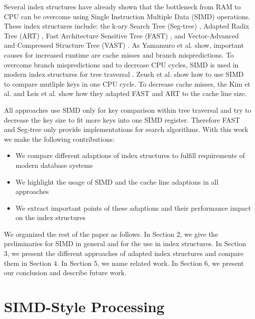 \documentclass[runningheads,a4paper]{llncs}
\begin{document}
Several index structures have already shown that the bottleneck from RAM to CPU can be overcome using Single Instruction Multiple Data (SIMD) \cite{suaib2011architecture} operations. These index structures include: the k-ary Search Tree (Seg-tree) \cite{zeuch2014adapting}, Adapted Radix Tree (ART) \cite{leis2013adaptive}, Fast Architecture Sensitive Tree (FAST) \cite{kim2010fast}, and Vector-Advanced and Compressed Structure Tree (VAST) \cite{yamamuro2012vast}. As Yamamuro et al. show, important causes for increased runtime are cache misses and branch mispredictions. To overcome branch mispredictions and to decrease CPU cycles, SIMD  is used in modern index structures for tree traversal \cite{zhou2002implementing}. Zeuch et al. show how to use SIMD to compare mutliple keys in one CPU cycle. To decrease cache misses, the Kim et al. and Leis et al. show how they adapted FAST and ART to the cache line size.  

All approaches use SIMD only for key comparison within tree traversal and try to decrease the key size to fit more keys into one SIMD register. Therefore FAST and Seg-tree only provide implementations for search algorithms. With this work we make the following contributions:
\begin{itemize}
	\item We compare different adaptions of index structures to fulfill requirements of modern database systems
	\item We highlight the usage of SIMD and the cache line adaptions in all approaches
	\item We extract important points of these adaptions and their performance impact on the index structures
\end{itemize}
We organized the rest of the paper as follows. In Section 2, we give the preliminaries for SIMD in general and for the use in index structures. In Section 3, we present the different approaches of adapted index structures and compare them in Section 4. In Section 5, we name related work. In Section 6, we present our conclusion and describe future work. 
\section{SIMD-Style Processing}
\end{document}
